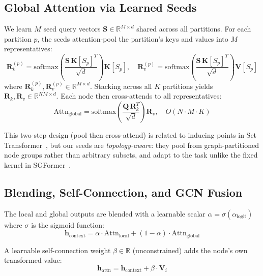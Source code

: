 \documentclass[manuscript, screen, review, anonymous]{acmart}
\begin{document}
\subsection{Global Attention via Learned Seeds}
\label{sec:global_attn}

We learn $M$ seed query vectors $\mathbf{S} \in \mathbb{R}^{M \times d}$ shared across all partitions. For each partition $p$, the seeds attention-pool the partition's keys and values into $M$ representatives:
\begin{equation}
\mathbf{R}_k^{(p)} = \mathrm{softmax}\!\left( \frac{\mathbf{S} \, \mathbf{K}[S_p]^T}{\sqrt{d}} \right) \mathbf{K}[S_p], \quad \mathbf{R}_v^{(p)} = \mathrm{softmax}\!\left( \frac{\mathbf{S} \, \mathbf{K}[S_p]^T}{\sqrt{d}} \right) \mathbf{V}[S_p]
\label{eq:reps}
\end{equation}
where $\mathbf{R}_k^{(p)}, \mathbf{R}_v^{(p)} \in \mathbb{R}^{M \times d}$. Stacking across all $K$ partitions yields $\mathbf{R}_k, \mathbf{R}_v \in \mathbb{R}^{KM \times d}$. Each node then cross-attends to all representatives:
\begin{equation}
\text{Attn}_{\text{global}} = \text{softmax}\left( \frac{\mathbf{Q} \, \mathbf{R}_k^T}{\sqrt{d}} \right) \mathbf{R}_v, \quad O(N \cdot M \cdot K)
\end{equation}

This two-step design (pool then cross-attend) is related to inducing points in Set Transformer~\cite{lee2019set}, but our seeds are \emph{topology-aware}: they pool from graph-partitioned node groups rather than arbitrary subsets, and adapt to the task unlike the fixed kernel in SGFormer~\cite{wu2023sgformer}.

\subsection{Blending, Self-Connection, and GCN Fusion}

The local and global outputs are blended with a learnable scalar $\alpha = \sigma(\alpha_{\text{logit}})$ where $\sigma$ is the sigmoid function:
\begin{equation}
\mathbf{h}_{\text{context}} = \alpha \cdot \text{Attn}_{\text{local}} + (1 - \alpha) \cdot \text{Attn}_{\text{global}}
\end{equation}

A learnable self-connection weight $\beta \in \mathbb{R}$ (unconstrained) adds the node's own transformed value:
\begin{equation}
\mathbf{h}_{\text{attn}} = \mathbf{h}_{\text{context}} + \beta \cdot \mathbf{V}_i
\end{equation}
\end{document}
